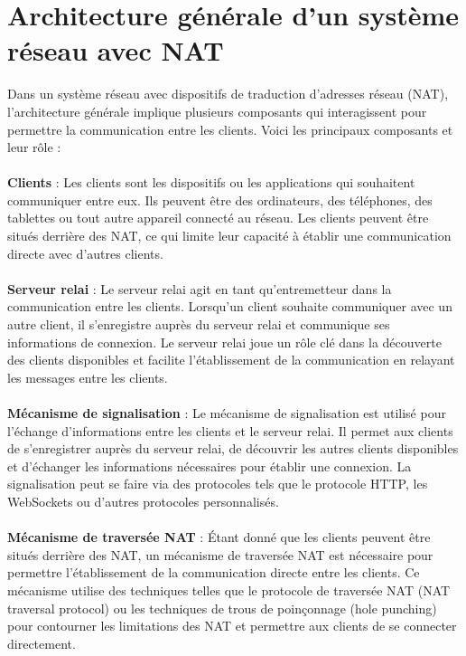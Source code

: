 \section{Architecture générale d'un système réseau avec NAT}

Dans un système réseau avec dispositifs de traduction d'adresses réseau (NAT), l'architecture générale implique plusieurs composants qui interagissent pour permettre la communication entre les clients. 
Voici les principaux composants et leur rôle :

\paragraph{}
\textbf{Clients} : Les clients sont les dispositifs ou les applications qui souhaitent communiquer entre eux. Ils peuvent être des ordinateurs, des téléphones, des tablettes ou tout autre appareil 
connecté au réseau. Les clients peuvent être situés derrière des NAT, ce qui limite leur capacité à établir une communication directe avec d'autres clients. 

\paragraph{}
\textbf{Serveur relai} : Le serveur relai agit en tant qu'entremetteur dans la communication entre les clients. Lorsqu'un client souhaite communiquer avec un autre client, il s'enregistre auprès 
du serveur relai et communique ses informations de connexion. Le serveur relai joue un rôle clé dans la découverte des clients disponibles et facilite l'établissement de la communication en relayant les messages entre les clients.

\paragraph{}
\textbf{Mécanisme de signalisation} : Le mécanisme de signalisation est utilisé pour l'échange d'informations entre les clients et le serveur relai. Il permet aux clients de s'enregistrer auprès du 
serveur relai, de découvrir les autres clients disponibles et d'échanger les informations nécessaires pour établir une connexion. La signalisation peut se faire via des protocoles tels que le protocole 
HTTP, les WebSockets ou d'autres protocoles personnalisés.

\paragraph{}
\textbf{Mécanisme de traversée NAT} : Étant donné que les clients peuvent être situés derrière des NAT, un mécanisme de traversée NAT est nécessaire pour permettre l'établissement de la communication directe entre 
les clients. Ce mécanisme utilise des techniques telles que le protocole de traversée NAT (NAT traversal protocol) ou les techniques de trous de poinçonnage (hole punching) pour contourner les limitations des NAT 
et permettre aux clients de se connecter directement.

